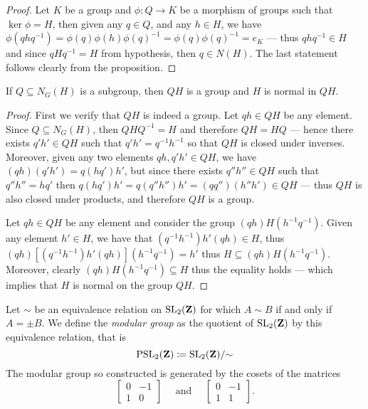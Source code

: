 \begin{proof}
Let \(K\) be a group and \(\phi: Q \to K\) be a morphism of groups such that
\(\ker \phi = H\), then given any \(q \in Q\), and any \(h \in H\), we have
\(\phi(q h q^{-1}) = \phi(q) \phi(h) \phi(q)^{-1} = \phi(q) \phi(q)^{-1} = e_K\)
--- thus \(q h q^{-1} \in H\) and since \(q H q^{-1} = H\) from hypothesis, then
\(q \in N(H)\). The last statement follows clearly from the proposition.
\end{proof}

\begin{lemma}
If \(Q \subseteq N_G(H)\) is a subgroup, then \(Q H\) is a group and \(H\) is
normal in \(Q H\).
\end{lemma}

\begin{proof}
First we verify that \(Q H\) is indeed a group. Let \(q h \in Q H\) be any
element. Since \(Q \subseteq N_G(H)\), then \(Q H Q^{-1} = H\) and therefore
\(Q H = H Q\) --- hence there exists \(q' h' \in Q H\) such that
\(q' h' = q^{-1} h^{-1}\) so that \(Q H\) is closed under inverses. Moreover,
given any two elements \(q h, q' h' \in Q H\), we have
\((q h)(q' h') = q (h q') h'\), but since there exists \(q'' h'' \in Q H\) such
that \(q'' h'' = h q'\) then
\(q(h q') h' = q (q'' h'') h' = (q q'') (h'' h') \in Q H\) --- thus \(Q H\) is
also closed under products, and therefore \(Q H\) is a group.

Let \(q h \in Q H\) be any element and consider the group
\((q h) H (h^{-1} q^{-1})\). Given any element \(h' \in H\), we have that
\((q^{-1} h^{-1}) h' (q h) \in H\), thus
\((q h) [(q^{-1} h^{-1}) h' (q h)] (h^{-1} q ^{-1}) = h'\) thus
\(H \subseteq (q h) H (h^{-1} q^{-1})\). Moreover, clearly
\((q h) H (h^{-1} q^{-1}) \subseteq H\) thus the equality holds --- which
implies that \(H\) is normal on the group \(Q H\).
\end{proof}

\begin{proposition}
\label{prop:PSL_2(Z)-generators}
Let \(\sim\) be an equivalence relation on \(\operatorname{SL}_2(\mathbf{Z})\) for which \(A \sim B\)
if and only if \(A = \pm B\). We define the \emph{modular group} as the quotient
of \(\operatorname{SL}_2(\mathbf{Z})\) by this equivalence relation, that is
\[
\operatorname{PSL}_2(\mathbf{Z}) \coloneq \operatorname{SL}_2(\mathbf{Z})/{\sim}
\]
The modular group so constructed is generated by the cosets of the matrices
\[
\begin{bmatrix}
  0 & -1 \\ 1 & 0
\end{bmatrix}
\quad
\text{ and }
\quad
\begin{bmatrix}
  0 & -1 \\ 1 & 1
\end{bmatrix}.
\]
\end{proposition}

